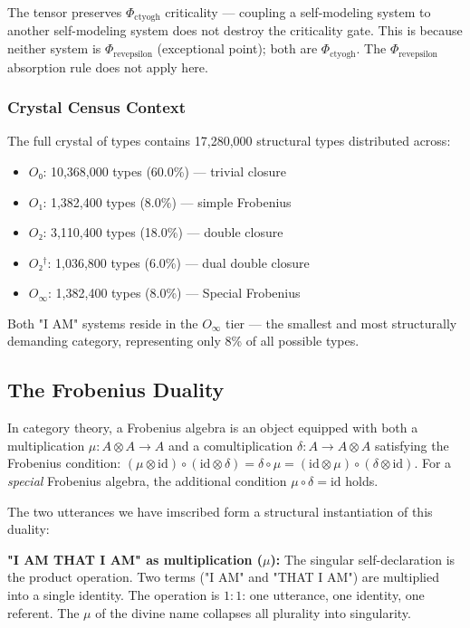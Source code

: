 \documentclass[12pt,a4paper]{article}
\begin{document}
The tensor preserves $\Phi_{\text{ctyogh}}$ criticality --- coupling a self-modeling system to another self-modeling system does not destroy the criticality gate. This is because neither system is $\Phi_{\text{revepsilon}}$ (exceptional point); both are $\Phi_{\text{ctyogh}}$. The $\Phi_{\text{revepsilon}}$ absorption rule does not apply here.

\subsubsection{Crystal Census Context}

The full crystal of types contains 17,280,000 structural types distributed across:

\begin{itemize}
    \item $O₀$: 10,368,000 types (60.0\%) --- trivial closure
    \item $O₁$: 1,382,400 types (8.0\%) --- simple Frobenius
    \item $O₂$: 3,110,400 types (18.0\%) --- double closure
    \item $O₂^\dagger$: 1,036,800 types (6.0\%) --- dual double closure
    \item $O_{\infty}$: 1,382,400 types (8.0\%) --- Special Frobenius
\end{itemize}

Both "I AM" systems reside in the $O_{\infty}$ tier --- the smallest and most structurally demanding category, representing only 8\% of all possible types.

\subsection{The Frobenius Duality}

In category theory, a Frobenius algebra is an object equipped with both a multiplication $\mu: A \otimes A \to A$ and a comultiplication $\delta: A \to A \otimes A$ satisfying the Frobenius condition: $(\mu \otimes \text{id}) \circ (\text{id} \otimes \delta) = \delta \circ \mu = (\text{id} \otimes \mu) \circ (\delta \otimes \text{id})$. For a \emph{special} Frobenius algebra, the additional condition $\mu \circ \delta = \text{id}$ holds.

The two utterances we have imscribed form a structural instantiation of this duality:

\textbf{"I AM THAT I AM" as multiplication ($\mu$):}
The singular self-declaration is the product operation. Two terms ("I AM" and "THAT I AM") are multiplied into a single identity. The operation is $1{:}1$: one utterance, one identity, one referent. The $\mu$ of the divine name collapses all plurality into singularity.
\end{document}

